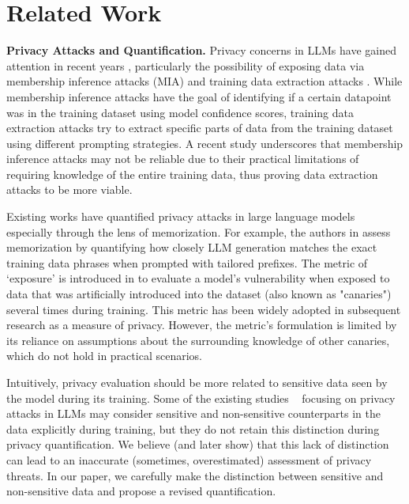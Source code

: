 \section{Related Work}
\label{sec:related_work}
\textbf{Privacy Attacks and Quantification.}
Privacy concerns in LLMs have gained attention in recent years \cite{KIBRIYA2024109698, YAO2024100211}, particularly the possibility of exposing data via membership inference attacks (MIA) \cite{mireshghallah-etal-2022-quantifying, mattern2023membership, fu2023practical, kaneko2024sampling} and training data extraction attacks \cite{carlini2021extractingtrainingdatalarge, mireshghallah-etal-2022-empirical, panda2024teach}. While membership inference attacks have the goal of identifying if a certain datapoint was in the training dataset using model confidence scores, training data extraction attacks try to extract specific parts of data from the training dataset using different prompting strategies. A recent study \cite{zhang2024membershipinferenceattacksprove} underscores that membership inference attacks may not be reliable due to their practical limitations of requiring knowledge of the entire training data, thus proving data extraction attacks to be more viable.

Existing works have quantified privacy attacks in large language models especially through the lens of memorization. For example, the authors in \cite{carlini2023quantifying} assess memorization by quantifying how closely LLM generation matches the exact training data phrases when prompted with tailored prefixes. The metric of `exposure' is introduced in \cite{10.5555/3361338.3361358} to evaluate a model’s vulnerability when exposed to data that was artificially introduced into the dataset (also known as "canaries") several times during training. 
This metric has been widely adopted in subsequent research \cite{shi-etal-2022-selective, zhao-etal-2022-provably} as a measure of privacy. However, the metric’s formulation is limited by its reliance on assumptions about the surrounding knowledge of other canaries, which do not hold in practical scenarios. 

Intuitively, privacy evaluation should be more related to sensitive data seen by the model during its training. Some of the existing studies ~\cite{10.5555/3666122.3667033, 10179300, zhao-etal-2022-provably, shi-etal-2022-selective} focusing on privacy attacks in LLMs may consider sensitive and non-sensitive counterparts in the data explicitly during training, but they do not retain this distinction during privacy quantification. We believe (and later show) that this lack of distinction can lead to an inaccurate (sometimes, overestimated) assessment of privacy threats. In our paper, we carefully make the distinction between sensitive and non-sensitive data and propose a revised quantification.

